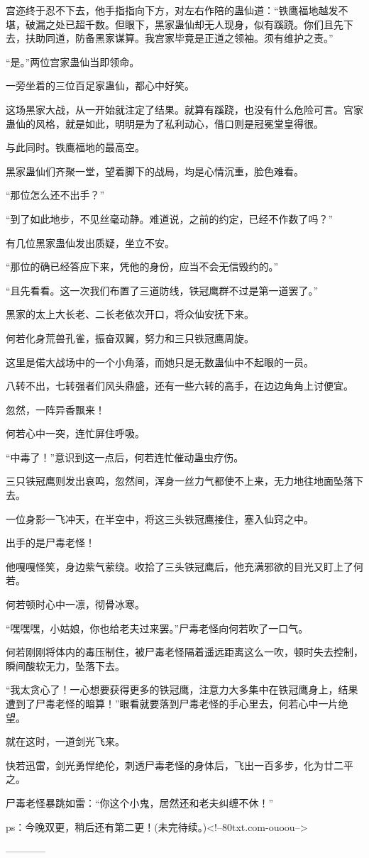 \begin{this_body}
宫迩终于忍不下去，他手指指向下方，对左右作陪的蛊仙道：“铁鹰福地越发不堪，破漏之处已超千数。但眼下，黑家蛊仙却无人现身，似有蹊跷。你们且先下去，扶助同道，防备黑家谋算。我宫家毕竟是正道之领袖。须有维护之责。”

“是。”两位宫家蛊仙当即领命。

一旁坐着的三位百足家蛊仙，都心中好笑。

这场黑家大战，从一开始就注定了结果。就算有蹊跷，也没有什么危险可言。宫家蛊仙的风格，就是如此，明明是为了私利动心，借口则是冠冕堂皇得很。

与此同时。铁鹰福地的最高空。

黑家蛊仙们齐聚一堂，望着脚下的战局，均是心情沉重，脸色难看。

“那位怎么还不出手？”

“到了如此地步，不见丝毫动静。难道说，之前的约定，已经不作数了吗？”

有几位黑家蛊仙发出质疑，坐立不安。

“那位的确已经答应下来，凭他的身份，应当不会无信毁约的。”

“且先看看。这一次我们布置了三道防线，铁冠鹰群不过是第一道罢了。”

黑家的太上大长老、二长老依次开口，将众仙安抚下来。

何若化身荒兽孔雀，振奋双翼，努力和三只铁冠鹰周旋。

这里是偌大战场中的一个小角落，而她只是无数蛊仙中不起眼的一员。

八转不出，七转强者们风头鼎盛，还有一些六转的高手，在边边角角上讨便宜。

忽然，一阵异香飘来！

何若心中一突，连忙屏住呼吸。

“中毒了！”意识到这一点后，何若连忙催动蛊虫疗伤。

三只铁冠鹰则发出哀鸣，忽然间，浑身一丝力气都使不上来，无力地往地面坠落下去。

一位身影一飞冲天，在半空中，将这三头铁冠鹰接住，塞入仙窍之中。

出手的是尸毒老怪！

他嘎嘎怪笑，身边紫气萦绕。收拾了三头铁冠鹰后，他充满邪欲的目光又盯上了何若。

何若顿时心中一凛，彻骨冰寒。

“嘿嘿嘿，小姑娘，你也给老夫过来罢。”尸毒老怪向何若吹了一口气。

何若刚刚将体内的毒压制住，被尸毒老怪隔着遥远距离这么一吹，顿时失去控制，瞬间酸软无力，坠落下去。

“我太贪心了！一心想要获得更多的铁冠鹰，注意力大多集中在铁冠鹰身上，结果遭到了尸毒老怪的暗算！”眼看就要落到尸毒老怪的手心里去，何若心中一片绝望。

就在这时，一道剑光飞来。

快若迅雷，剑光勇悍绝伦，刺透尸毒老怪的身体后，飞出一百多步，化为廿二平之。

尸毒老怪暴跳如雷：“你这个小鬼，居然还和老夫纠缠不休！”

ps：今晚双更，稍后还有第二更！(未完待续。)<!--80txt.com-ouoou-->

------------

\end{this_body}

